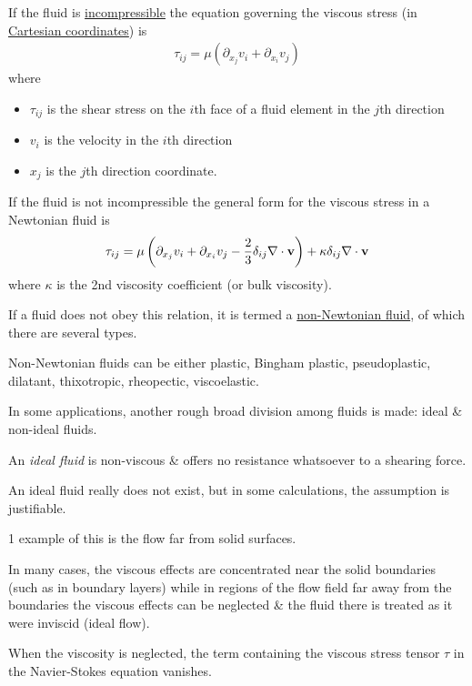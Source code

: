 \documentclass{article}
\begin{document}
If the fluid is \href{https://en.wikipedia.org/wiki/Incompressible_fluid}{incompressible} the equation governing the viscous stress (in \href{https://en.wikipedia.org/wiki/Cartesian_coordinate_system}{Cartesian coordinates}) is
\begin{align*}
	\tau_{ij} = \mu\left(\partial_{x_j}v_i + \partial_{x_i}v_j\right)
\end{align*}
where
\begin{itemize}
	\item $\tau_{ij}$ is the shear stress on the $i$th face of a fluid element in the $j$th direction
	\item $v_i$ is the velocity in the $i$th direction
	\item $x_j$ is the $j$th direction coordinate.
\end{itemize}
If the fluid is not incompressible the general form for the viscous stress in a Newtonian fluid is
\begin{align*}
	\tau_{ij} = \mu\left(\partial_{x_j}v_i + \partial_{x_i}v_j - \frac{2}{3}\delta_{ij}\nabla\cdot{\bf v}\right) + \kappa\delta_{ij}\nabla\cdot{\bf v}
\end{align*}
where $\kappa$ is the 2nd viscosity coefficient (or bulk viscosity).

If a fluid does not obey this relation, it is termed a \href{https://en.wikipedia.org/wiki/Non-Newtonian_fluid}{non-Newtonian fluid}, of which there are several types.

Non-Newtonian fluids can be either plastic, Bingham plastic, pseudoplastic, dilatant, thixotropic, rheopectic, viscoelastic.

%
In some applications, another rough broad division among fluids is made: ideal \& non-ideal fluids.

An \textit{ideal fluid} is non-viscous \& offers no resistance whatsoever to a shearing force.

An ideal fluid really does not exist, but in some calculations, the assumption is justifiable.

1 example of this is the flow far from solid surfaces.

In many cases, the viscous effects are concentrated near the solid boundaries (such as in boundary layers) while in regions of the flow field far away from the boundaries the viscous effects can be neglected \& the fluid there is treated as it were inviscid (ideal flow).

When the viscosity is neglected, the term containing the viscous stress tensor $\tau$ in the Navier-Stokes equation vanishes.
\end{document}
